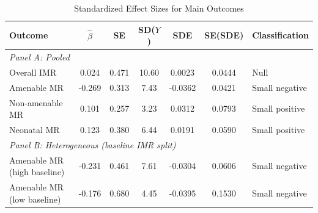 \begin{table}[H]
\centering
\caption{Standardized Effect Sizes for Main Outcomes}
\label{tab:sde}
\small
\begin{threeparttable}
\begin{tabular}{lcccccl}
\toprule
Outcome & $\hat{\beta}$ & SE & SD($Y$) & SDE & SE(SDE) & Classification \\
\midrule
\multicolumn{7}{l}{\textit{Panel A: Pooled}} \\
Overall IMR & 0.024 & 0.471 & 10.60 & 0.0023 & 0.0444 & Null \\
Amenable MR & -0.269 & 0.313 & 7.43 & -0.0362 & 0.0421 & Small negative \\
Non-amenable MR & 0.101 & 0.257 & 3.23 & 0.0312 & 0.0793 & Small positive \\
Neonatal MR & 0.123 & 0.380 & 6.44 & 0.0191 & 0.0590 & Small positive \\
\midrule
\multicolumn{7}{l}{\textit{Panel B: Heterogeneous (baseline IMR split)}} \\
Amenable MR (high baseline) & -0.231 & 0.461 & 7.61 & -0.0304 & 0.0606 & Small negative \\
Amenable MR (low baseline) & -0.176 & 0.680 & 4.45 & -0.0395 & 0.1530 & Small negative \\
\bottomrule
\end{tabular}
\begin{tablenotes}[flushleft]
\scriptsize

\end{tablenotes}
\end{threeparttable}
\end{table}
